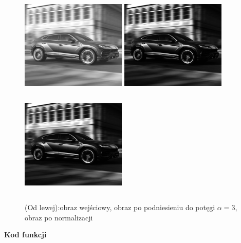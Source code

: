 \documentclass[magisterska,openany]{pracadypl}
\begin{document}
\begin{figure}[h]
\centering
\includegraphics[width=5cm, height=5cm]{orgi/gLU.jpg}
\includegraphics[width=5cm, height=5cm]{3_6/powG2.jpg}
\includegraphics[width=5cm, height=5cm]{3_6/npowG2.jpg}
\caption{(Od lewej):obraz wejściowy, obraz po podniesieniu do potęgi $\alpha=3$,
obraz po normalizacji}
\end{figure}

\newpage
\textbf{\Large Kod funkcji}
   
\end{document}
